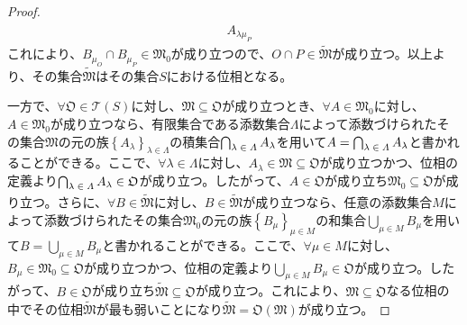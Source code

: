 \documentclass[dvipdfmx]{jsarticle}
\begin{document}
\begin{proof}
\begin{align*}
{\begin{matrix}
\end{matrix}} A_{\lambda\mu_{P}}
\end{align*}
これにより、$B_{\mu_{O}} \cap B_{\mu_{P}} \in \mathfrak{M}_{0}$が成り立つので、$O \cap P \in \widetilde{\mathfrak{M}}$が成り立つ。以上より、その集合$\widetilde{\mathfrak{M}}$はその集合$S$における位相となる。\par
一方で、$\mathfrak{\forall O \in}\mathcal{T}(S)$に対し、$\mathfrak{M \subseteq O}$が成り立つとき、$\forall A \in \mathfrak{M}_{0}$に対し、$A \in \mathfrak{M}_{0}$が成り立つなら、有限集合である添数集合$\varLambda$によって添数づけられたその集合$\mathfrak{M}$の元の族$\left\{ A_{\lambda} \right\}_{\lambda \in \varLambda}$の積集合$\bigcap_{\scriptsize \begin{matrix}
\lambda \in \varLambda \\
\end{matrix}} A_{\lambda}$を用いて$A = \bigcap_{\scriptsize \begin{matrix}
\lambda \in \varLambda \\
\end{matrix}} A_{\lambda}$と書かれることができる。ここで、$\forall\lambda \in \varLambda$に対し、$A_{\lambda}\in \mathfrak{M \subseteq}\mathfrak{O}$が成り立つかつ、位相の定義より$\bigcap_{\scriptsize \begin{matrix}
\lambda \in \varLambda \\
\end{matrix}} A_{\lambda}\in \mathfrak{O}$が成り立つ。したがって、$A \in \mathfrak{O}$が成り立ち$\mathfrak{M}_{0}\subseteq \mathfrak{O}$が成り立つ。さらに、$\forall B \in \widetilde{\mathfrak{M}}$に対し、$B \in \widetilde{\mathfrak{M}}$が成り立つなら、任意の添数集合$M$によって添数づけられたその集合$\mathfrak{M}_{0}$の元の族$\left\{ B_{\mu} \right\}_{\mu \in M}$の和集合$\bigcup_{\mu \in M} B_{\mu}$を用いて$B = \bigcup_{\mu \in M} B_{\mu}$と書かれることができる。ここで、$\forall\mu \in M$に対し、$B_{\mu} \in \mathfrak{M}_{0}\subseteq \mathfrak{O}$が成り立つかつ、位相の定義より$\bigcup_{\mu \in M} B_{\mu}\in \mathfrak{O}$が成り立つ。したがって、$B \in \mathfrak{O}$が成り立ち$\widetilde{\mathfrak{M}}\subseteq \mathfrak{O}$が成り立つ。これにより、$\mathfrak{M \subseteq O}$なる位相の中でその位相$\widetilde{\mathfrak{M}}$が最も弱いことになり$\widetilde{\mathfrak{M}} = \mathfrak{O}\left( \mathfrak{M} \right)$が成り立つ。
\end{proof}
\end{document}
